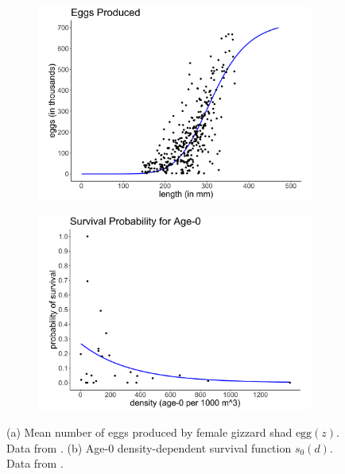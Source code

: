 \documentclass[preprint,review,12pt,authoryear]{elsarticle}
\providecommand{\DIFaddbeginFL}{} %
\providecommand{\DIFaddendFL}{} %
\providecommand{\DIFdelbeginFL}{} %
\providecommand{\DIFdelendFL}{} %
\begin{document}
\begin{figure}
\centering
\DIFdelbeginFL %
\DIFdelendFL \DIFaddbeginFL \begin{subfigure}[b]{.48\textwidth}
  \DIFaddendFL \includegraphics[width=\textwidth]{figures/eggs.png}
  \caption{}
  \label{fig:eggs}
\end{subfigure}
\DIFdelbeginFL %
\DIFdelendFL \DIFaddbeginFL \begin{subfigure}[b]{.48\textwidth}
  \DIFaddendFL \includegraphics[width=\textwidth]{figures/age0surv.png}
  \caption{}
  \label{fig:surv_age0}
\end{subfigure}
\caption{(a) Mean number of eggs produced by female gizzard shad $\mbox{egg}(z)$. Data from \citep{jons1997ovarian}.  (b) Age-0 density-dependent survival function $s_0(d)$. Data from \citep{michaletz2010overwinter}. }
\label{fig:fecundity}
\end{figure}    
\end{document}
